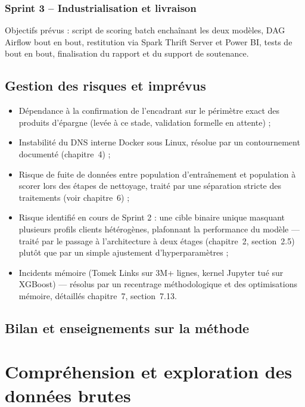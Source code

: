 \documentclass[11pt,a4paper]{report}
\begin{document}
\subsection{Sprint 3 -- Industrialisation et livraison}
Objectifs prévus : script de scoring batch enchaînant les deux modèles,
DAG Airflow bout en bout, restitution via Spark Thrift Server et Power BI,
tests de bout en bout, finalisation du rapport et du support de
soutenance.

\section{Gestion des risques et imprévus}
\begin{itemize}
  \item Dépendance à la confirmation de l'encadrant sur le périmètre exact
  des produits d'épargne (levée à ce stade, validation formelle en
  attente) ;
  \item Instabilité du DNS interne Docker sous Linux, résolue par un
  contournement documenté (chapitre~4) ;
  \item Risque de fuite de données entre population d'entraînement et
  population à scorer lors des étapes de nettoyage, traité par une
  séparation stricte des traitements (voir chapitre~6) ;
  \item Risque identifié en cours de Sprint 2 : une cible binaire unique
  masquant plusieurs profils clients hétérogènes, plafonnant la
  performance du modèle — traité par le passage à l'architecture à deux
  étages (chapitre~2, section~2.5) plutôt que par un simple ajustement
  d'hyperparamètres ;
  \item Incidents mémoire (Tomek Links sur 3M+ lignes, kernel Jupyter
  tué sur XGBoost) — résolus par un recentrage méthodologique et des
  optimisations mémoire, détaillés chapitre~7, section~7.13.
\end{itemize}

\section{Bilan et enseignements sur la méthode}


\chapter{Compréhension et exploration des données brutes}
\end{document}
